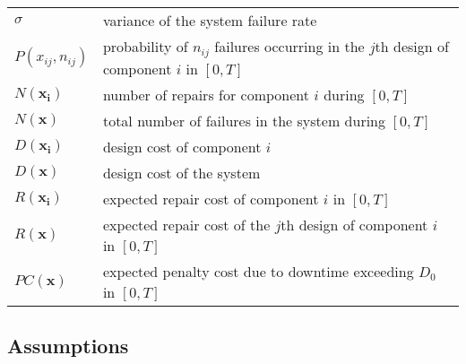 \documentclass[10pt,a4paper]{article}
\begin{document}
\begin{tabular}{l l}
$\sigma$ & variance of the system failure rate \\
$P(x_{ij},n_{ij})$  & probability of $n_{ij}$ failures occurring in the $j$th design of component $i$ in $[0, T]$ \\
$N(\boldsymbol{x_{i}})$ & number of repairs for component $i$ during $[0,T]$\\
$N(\boldsymbol{x})$ & total number of failures in the system during $[0,T]$ \\
$D(\boldsymbol{x_{i}})$  &  design cost of component $i$\\
$D(\boldsymbol{x})$ & design cost of the system\\
$R(\boldsymbol{x_{i}})$ & expected repair cost of component $i$ in $[0, T]$\\
$R(\boldsymbol{x})$ &  expected repair cost of the $j$th design of component $i$ in $[0, T]$\\
$PC(\boldsymbol{x})$ & expected penalty cost due to downtime exceeding $D_{0}$ in $[0, T]$\\

	\end{tabular}
	 \subsection{Assumptions}
	
\end{document}
